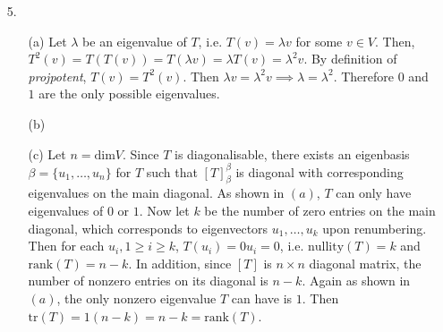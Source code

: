 \documentclass{article}
\begin{document}
\newpage

\begin{itemize}
	\item [5.]
	      \begin{itemize}
		      \item [(a)] Let $\lambda$ be an eigenvalue of $T$, i.e. $T(v)=\lambda v$ for some $v\in V$. Then, $T^2(v)=T(T(v))=T(\lambda v)=\lambda T(v)=\lambda^2v$. By definition of \textit{projpotent}, $T(v)=T^2(v)$. Then $\lambda v=\lambda^2 v \implies \lambda=\lambda^2$. Therefore $0$ and $1$ are the only possible eigenvalues.
		      \item [(b)]
			  \item [(c)] Let $n=\text{dim}V$. Since $T$ is diagonalisable, there exists an eigenbasis $\beta=\{u_1,\ldots,u_n\}$ for $T$ such that $[T]_\beta^\beta$ is diagonal with corresponding eigenvalues on the main diagonal. As shown in $(a)$, $T$ can only have eigenvalues of $0$ or $1$. Now let $k$ be the number of zero entries on the main diagonal, which corresponds to eigenvectors $u_1,\ldots,u_k$ upon renumbering. Then for each $u_i, 1\geq i\geq k$, $T(u_i)=0u_i=0$, i.e. $\text{nullity}(T)=k$ and $\text{rank}(T)=n-k$. In addition, since $[T]$ is $n\times n$ diagonal matrix, the number of nonzero entries on its diagonal is $n-k$. Again as shown in $(a)$, the only nonzero eigenvalue $T$ can have is $1$. Then $\text{tr}(T)=1(n-k)=n-k=\text{rank}(T)$.
	      \end{itemize}
\end{itemize}
\end{document}
